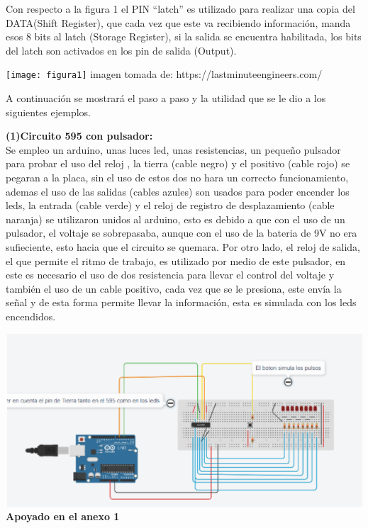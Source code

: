 \documentclass{article}
\begin{document}
Con respecto a la figura 1 el PIN “latch” es utilizado para realizar una copia del DATA(Shift Register), que cada vez que este va recibiendo información, manda esos 8 bits al latch (Storage Register), si la salida se encuentra habilitada, los bits del latch son activados en los pin de salida (Output).


\begin{center}
\texttt{[image: figura1]}
imagen tomada de: https://lastminuteengineers.com/

\end{center}
\newpage

A continuación se mostrará el paso a paso y la utilidad que se le dio a los siguientes ejemplos.\newline

\begin{justify}
\textbf{(1)Circuito 595 con pulsador:} \\
 Se empleo un arduino, unas luces led, unas resistencias, un pequeño pulsador para probar el uso del reloj , la tierra (cable negro) y el positivo (cable rojo) se pegaran a la placa, sin el uso de estos dos no hara un correcto funcionamiento, ademas el uso de las salidas (cables azules) son usados para poder encender los leds, la entrada (cable verde) y el reloj de registro de desplazamiento (cable naranja) se utilizaron unidos al arduino, esto es debido a que con el uso de un pulsador, el voltaje se sobrepasaba, aunque con el uso de la bateria de 9V no era sufieciente, esto hacia que el circuito se quemara. Por otro lado, el reloj de salida, el que permite el ritmo de trabajo, es utilizado por medio de este pulsador, en este es necesario el uso de dos resistencia para llevar el control del voltaje y también el uso de un cable positivo, cada vez que se le presiona, este envía la señal y de esta forma permite llevar la información, esta es simulada con los leds encendidos.
 \end{justify}

\includegraphics[scale=0.5]{figura2}
\centering
\textbf{Apoyado en el anexo 1}
\newline
\newline
\newline
\end{document}
